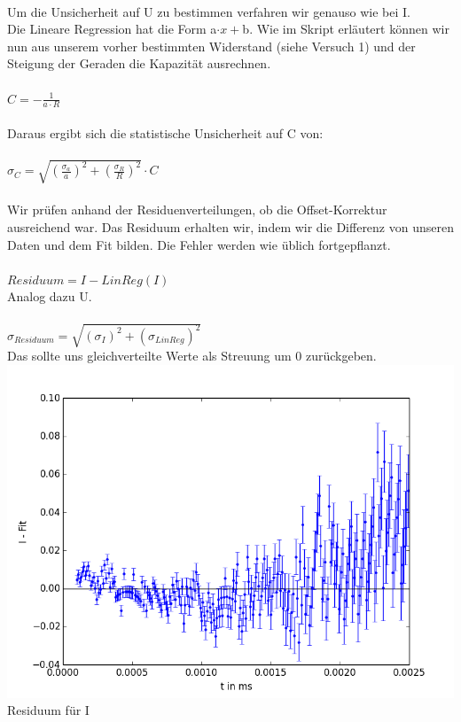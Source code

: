 \documentclass[12pt,a4paper]{article}
\begin{document}
\\Um die Unsicherheit auf U zu bestimmen verfahren wir genauso wie bei I.\\
Die Lineare Regression hat die Form a$\cdot x + $b. Wie im Skript erläutert können wir nun aus unserem vorher bestimmten Widerstand (siehe Versuch 1) und der Steigung der Geraden die Kapazität ausrechnen.\\
\\$C = -\frac{1}{a\cdot R}$\\
\\Daraus ergibt sich die statistische Unsicherheit auf C von:\\
\\$\sigma_C = \sqrt{(\frac{\sigma_a}{a})^2+(\frac{\sigma_R}{R})^2}\cdot C$\\
\\Wir prüfen anhand der Residuenverteilungen, ob die Offset-Korrektur ausreichend war. Das Residuum erhalten wir, indem wir die Differenz von unseren Daten und dem Fit bilden. Die Fehler werden wie üblich fortgepflanzt.\\
\\$Residuum = I - LinReg(I)$\\
Analog dazu U.\\
\\$\sigma_{Residuum} = \sqrt{(\sigma_{I})^2+(\sigma_{LinReg})^2}$\\
Das sollte uns gleichverteilte Werte als Streuung um 0 zurückgeben.\\
\includegraphics[scale=0.35]{residuum_I}\\
Residuum für I 
\end{document}
